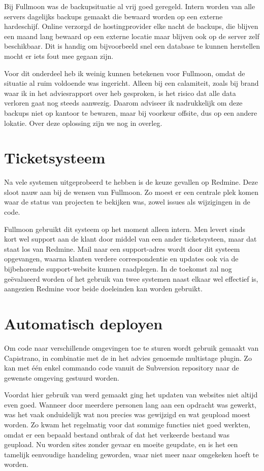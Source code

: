 Bij Fullmoon was de backupsituatie al vrij goed geregeld. Intern worden van alle servers dagelijks backups gemaakt die bewaard worden op een externe hardeschijf. Online verzorgd de hostingprovider elke nacht de backups, die blijven een maand lang bewaard op een externe locatie maar blijven ook op de server zelf beschikbaar. Dit is handig om bijvoorbeeld snel een database te kunnen herstellen mocht er iets fout mee gegaan zijn.

Voor dit onderdeel heb ik weinig kunnen betekenen voor Fullmoon, omdat de situatie al ruim voldoende was ingericht. Alleen bij een calamiteit, zoals bij brand waar ik in het adviesrapport over heb gesproken, is het risico dat alle data verloren gaat nog steeds aanwezig. Daarom adviseer ik nadrukkelijk om deze backups niet op kantoor te bewaren, maar bij voorkeur offsite, dus op een andere lokatie. Over deze oplossing zijn we nog in overleg.

\section{Ticketsysteem}

Na vele systemen uitgeprobeerd te hebben is de keuze gevallen op Redmine. Deze sloot nauw aan bij de wensen van Fullmoon. Zo moest er een centrale plek komen waar de status van projecten te bekijken was, zowel issues als wijzigingen in de code.

Fullmoon gebruikt dit systeem op het moment alleen intern. Men levert sinds kort wel support aan de klant door middel van een ander ticketsysteen, maar dat staat los van Redmine. Mail naar een support-adres wordt door dit systeem opgevangen, waarna klanten verdere correspondentie en updates ook via de bijbehorende support-website kunnen raadplegen. In de toekomst zal nog geëvalueerd worden of het gebruik van twee systemen naast elkaar wel effectief is, aangezien Redmine voor beide doeleinden kan worden gebruikt.

\section{Automatisch deployen}

Om code naar verschillende omgevingen toe te sturen wordt gebruik gemaakt van Capistrano, in combinatie met de in het advies genoemde multistage plugin. Zo kan met één enkel commando code vanuit de Subversion repository naar de gewenste omgeving gestuurd worden.

Voordat hier gebruik van werd gemaakt ging het updaten van websites niet altijd even goed. Wanneer door meerdere personen lang aan een opdracht was gewerkt, was het vaak onduidelijk wat nou precies was gewijzigd en wat geupload moest worden. Zo kwam het regelmatig voor dat sommige functies niet goed werkten, omdat er een bepaald bestand ontbrak of dat het verkeerde bestand was geupload. Nu worden sites zonder gevaar en moeite geupdate, en is het een tamelijk eenvoudige handeling geworden, waar niet meer naar omgekeken hoeft te worden.

